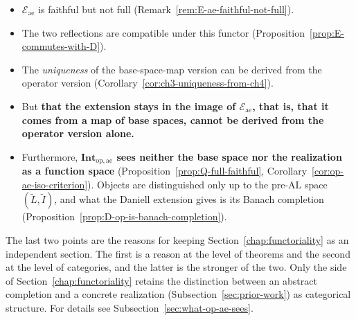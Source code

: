 \begin{remark}
  \begin{itemize}
    \item $\mathcal{E}_{\mathrm{ae}}$ is faithful but not full
      (Remark~\ref{rem:E-ae-faithful-not-full}).
    \item The two reflections are compatible under this functor
      (Proposition~\ref{prop:E-commutes-with-D}).
    \item The \emph{uniqueness} of the base-space-map version can be derived
      from the operator version
      (Corollary~\ref{cor:ch3-uniqueness-from-ch4}).
    \item But \textbf{that the extension stays in the image of
      $\mathcal{E}_{\mathrm{ae}}$, that is, that it comes from a map of base
      spaces, cannot be derived from the operator version alone.}
    \item Furthermore, \textbf{$\mathbf{Int}_{\mathrm{op},\mathrm{ae}}$ sees
      neither the base space nor the realization as a function space}
      (Proposition~\ref{prop:Q-full-faithful},
      Corollary~\ref{cor:op-ae-iso-criterion}).
      Objects are distinguished only up to the pre-AL space
      $(\widetilde{L},\widetilde{I})$, and what the Daniell extension gives is
      its Banach completion
      (Proposition~\ref{prop:D-op-is-banach-completion}).
  \end{itemize}

  The last two points are the reasons for keeping
  Section~\ref{chap:functoriality} as an independent section.
  The first is a reason at the level of theorems and the second at the level of
  categories, and the latter is the stronger of the two.
  Only the side of Section~\ref{chap:functoriality} retains the distinction
  between an abstract completion and a concrete realization
  (Subsection~\ref{sec:prior-work}) as categorical structure.
  For details see Subsection~\ref{sec:what-op-ae-sees}.
\end{remark}
